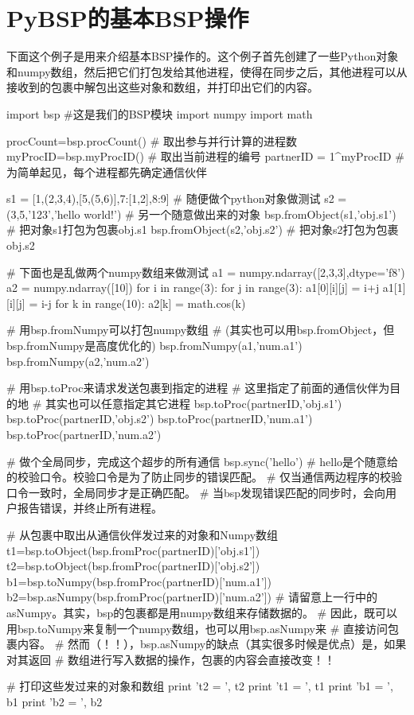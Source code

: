 \documentclass{article}
\begin{document}
\section{PyBSP的基本BSP操作}
下面这个例子是用来介绍基本BSP操作的。这个例子首先创建了一些Python对象和numpy数组，然后把它们打包发给其他进程，使得在同步之后，其他进程可以从接收到的包裹中解包出这些对象和数组，并打印出它们的内容。
\begin{python}
import bsp #这是我们的BSP模块
import numpy
import math

procCount=bsp.procCount() # 取出参与并行计算的进程数
myProcID=bsp.myProcID() # 取出当前进程的编号
partnerID = 1^myProcID # 为简单起见，每个进程都先确定通信伙伴

s1 = [1,(2,3,4),[5,(5,6)],{7:[1,2],8:9}] # 随便做个python对象做测试
s2 = (3,5,'123','hello world!') # 另一个随意做出来的对象
bsp.fromObject(s1,'obj.s1') # 把对象s1打包为包裹obj.s1
bsp.fromObject(s2,'obj.s2') # 把对象s2打包为包裹obj.s2

# 下面也是乱做两个numpy数组来做测试
a1 = numpy.ndarray([2,3,3],dtype='f8') 
a2 = numpy.ndarray([10])
for i in range(3):
    for j in range(3):
        a1[0][i][j] = i+j
        a1[1][i][j] = i-j
for k in range(10):
    a2[k] = math.cos(k)
    
# 用bsp.fromNumpy可以打包numpy数组
# (其实也可以用bsp.fromObject，但bsp.fromNumpy是高度优化的)
bsp.fromNumpy(a1,'num.a1')
bsp.fromNumpy(a2,'num.a2')

# 用bsp.toProc来请求发送包裹到指定的进程
# 这里指定了前面的通信伙伴为目的地
# 其实也可以任意指定其它进程
bsp.toProc(partnerID,'obj.s1') 
bsp.toProc(partnerID,'obj.s2')
bsp.toProc(partnerID,'num.a1')
bsp.toProc(partnerID,'num.a2')

# 做个全局同步，完成这个超步的所有通信
bsp.sync('hello') 
# hello是个随意给的校验口令。校验口令是为了防止同步的错误匹配。
# 仅当通信两边程序的校验口令一致时，全局同步才是正确匹配。
# 当bsp发现错误匹配的同步时，会向用户报告错误，并终止所有进程。

# 从包裹中取出从通信伙伴发过来的对象和Numpy数组
t1=bsp.toObject(bsp.fromProc(partnerID)['obj.s1'])
t2=bsp.toObject(bsp.fromProc(partnerID)['obj.s2'])
b1=bsp.toNumpy(bsp.fromProc(partnerID)['num.a1'])
b2=bsp.asNumpy(bsp.fromProc(partnerID)['num.a2'])
# 请留意上一行中的asNumpy。其实，bsp的包裹都是用numpy数组来存储数据的。
# 因此，既可以用bsp.toNumpy来复制一个numpy数组，也可以用bsp.asNumpy来
# 直接访问包裹内容。
# 然而（！！），bsp.asNumpy的缺点（其实很多时候是优点）是，如果对其返回
# 数组进行写入数据的操作，包裹的内容会直接改变！！

# 打印这些发过来的对象和数组
print 't2 = ', t2
print 't1 = ', t1
print 'b1 = ', b1
print 'b2 = ', b2
\end{python}
\end{document}
